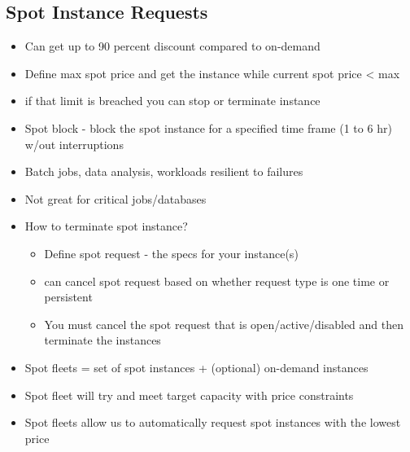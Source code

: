 \documentclass[]{scrartcl}
\begin{document}
\subsection{Spot Instance Requests}
\begin{itemize}
	\item Can get up to 90 percent discount compared to on-demand
	\item Define max spot price and get the instance while current spot price < max
	\item if that limit is breached you can stop or terminate instance
	\item Spot block - block the spot instance for a specified time frame (1 to 6 hr) w/out interruptions
	\item Batch jobs, data analysis, workloads resilient to failures
	\item Not great for critical jobs/databases
	\item How to terminate spot instance?
	\begin{itemize}
		\item Define spot request - the specs for your instance(s)
		\item can cancel spot request based on whether request type is one time or persistent
		\item You must cancel the spot request that is open/active/disabled and then terminate the instances
	\end{itemize}
	\item Spot fleets = set of spot instances + (optional) on-demand instances
	\item Spot fleet will try and meet target capacity with price constraints
	\item Spot fleets allow us to automatically request spot instances with the lowest price
\end{itemize}
\end{document}
